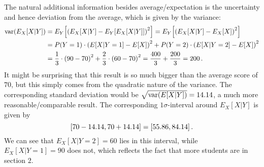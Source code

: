 \begin{ex}
The natural additional information besides average/expectation is the uncertainty and hence deviation from the average, which is given by the variance:
\begin{align*}
\operatorname{var}(E_X[X | Y]) &= E_Y\qty[\qty(E_X[X | Y] - E_Y[E_X[X | Y]])^2] = E_Y\qty[\qty(E_X[X | Y] - E_X[X])^2]
\\
&= P(Y = 1) \cdot \qty(E[X | Y = 1] - E[X])^2 + P(Y = 2) \cdot \qty(E[X | Y = 2] - E[X])^2
\\
&= \frac{1}{3} \cdot \qty(90 - 70)^2 + \frac{2}{3} \cdot \qty(60 - 70)^2 = \frac{400}{3} + \frac{200}{3} = 200 \, .
\end{align*}
It might be surprising that this result is so much bigger than the average score of $70$, but this simply comes from the quadratic nature of the variance. The corresponding standard deviation would be $\sqrt{\operatorname{var}(E[X | Y])} = 14.14$, a much more reasonable/comparable result. %
The corresponding $1\sigma$-interval around $E_X[X | Y]$ is given by
\begin{equation*}
\qty[70 - 14.14, 70 + 14.14] = \qty[55.86, 84.14] \, .
\end{equation*}
We can see that $E_X[X | Y = 2] = 60$ lies in this interval, while $E_X[X | Y = 1] = 90$ does not, which reflects the fact that more students are in section $2$.



\end{ex}
